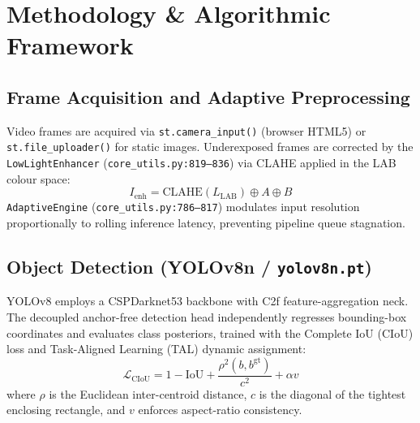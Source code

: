 \documentclass[conference]{IEEEtran}
\begin{document}
\section{Methodology \& Algorithmic Framework}

\subsection{Frame Acquisition and Adaptive Preprocessing}
Video frames are acquired via \texttt{st.camera\_input()} (browser HTML5) or
\texttt{st.file\_uploader()} for static images. Underexposed frames are
corrected by the \texttt{LowLightEnhancer} (\texttt{core\_utils.py:819--836})
via CLAHE applied in the LAB colour space:
\begin{equation}
    I_\text{enh} = \text{CLAHE}(L_\text{LAB}) \oplus A \oplus B
\end{equation}
\texttt{AdaptiveEngine} (\texttt{core\_utils.py:786--817}) modulates input
resolution proportionally to rolling inference latency, preventing pipeline
queue stagnation.

\subsection{Object Detection (YOLOv8n / \texttt{yolov8n.pt})}
YOLOv8 employs a CSPDarknet53 backbone with C2f feature-aggregation neck.
The decoupled anchor-free detection head independently regresses bounding-box
coordinates and evaluates class posteriors, trained with the Complete IoU
(CIoU) loss and Task-Aligned Learning (TAL) dynamic assignment:
\begin{equation}
    \mathcal{L}_\text{CIoU} = 1 - \text{IoU} +
    \frac{\rho^2(b,b^\text{gt})}{c^2} + \alpha v
\end{equation}
where $\rho$ is the Euclidean inter-centroid distance, $c$ is the diagonal of
the tightest enclosing rectangle, and $v$ enforces aspect-ratio consistency.
\end{document}
